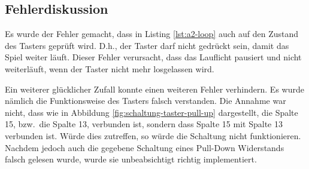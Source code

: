\subsection{Fehlerdiskussion}
\label{subsec:a2-fehlerdiskussion}

Es wurde der Fehler gemacht, dass in Listing \ref{lst:a2-loop} auch auf den Zustand des Tasters geprüft wird.
D.h., der Taster darf nicht gedrückt sein, damit das Spiel weiter läuft.
Dieser Fehler verursacht, dass das Lauflicht pausiert und nicht weiterläuft, wenn der Taster nicht mehr losgelassen wird.

Ein weiterer glücklicher Zufall konnte einen weiteren Fehler verhindern.
Es wurde nämlich die Funktionsweise des Tasters falsch verstanden.
Die Annahme war nicht, dass wie in Abbildung \ref{fig:schaltung-taster-pull-up} dargestellt, die Spalte 15, bzw.\ die Spalte 13,  verbunden ist, sondern dass Spalte 15 mit Spalte 13 verbunden ist.
Würde dies zutreffen, so würde die Schaltung nicht funktionieren.
Nachdem jedoch auch die gegebene Schaltung eines Pull-Down Widerstands falsch gelesen wurde, wurde sie unbeabsichtigt richtig implementiert.
